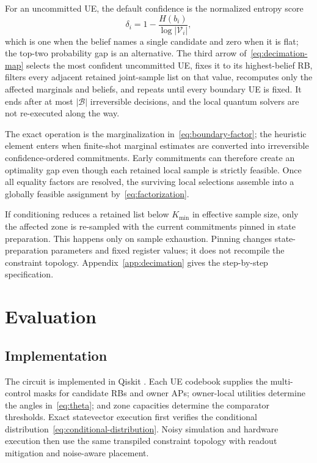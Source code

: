 \documentclass[journal]{IEEEtran}
\newcommand{\calV}{\mathcal{V}}  %
\newcommand{\calB}{\mathcal{B}}  %
\begin{document}
For an uncommitted UE, the default confidence is the normalized entropy score
\begin{equation}
\label{eq:decimation}
\delta_i=1-\frac{H(b_i)}{\log|\calV_i|},
\end{equation}
which is one when the belief names a single candidate and zero when it is flat; the top-two probability gap is an alternative. The third arrow of~\eqref{eq:decimation-map} selects the most confident uncommitted UE, fixes it to its highest-belief RB, filters every adjacent retained joint-sample list on that value, recomputes only the affected marginals and beliefs, and repeats until every boundary UE is fixed. It ends after at most $|\calB|$ irreversible decisions, and the local quantum solvers are not re-executed along the way.

The exact operation is the marginalization in~\eqref{eq:boundary-factor}; the heuristic element enters when finite-shot marginal estimates are converted into irreversible confidence-ordered commitments. Early commitments can therefore create an optimality gap even though each retained local sample is strictly feasible. Once all equality factors are resolved, the surviving local selections assemble into a globally feasible assignment by~\eqref{eq:factorization}.

If conditioning reduces a retained list below $K_{\min}$ in effective sample size, only the affected zone is re-sampled with the current commitments pinned in state preparation. This happens only on sample exhaustion. Pinning changes state-preparation parameters and fixed register values; it does not recompile the constraint topology. Appendix~\ref{app:decimation} gives the step-by-step specification.

\section{Evaluation}
\label{sec:eval}

\subsection{Implementation}
\label{sec:eval-impl}

The circuit is implemented in Qiskit \cite{qiskit}. Each UE codebook supplies the multi-control masks for candidate RBs and owner APs; owner-local utilities determine the angles in~\eqref{eq:theta}; and zone capacities determine the comparator thresholds. Exact statevector execution first verifies the conditional distribution~\eqref{eq:conditional-distribution}. Noisy simulation and hardware execution then use the same transpiled constraint topology with readout mitigation and noise-aware placement.
\end{document}
